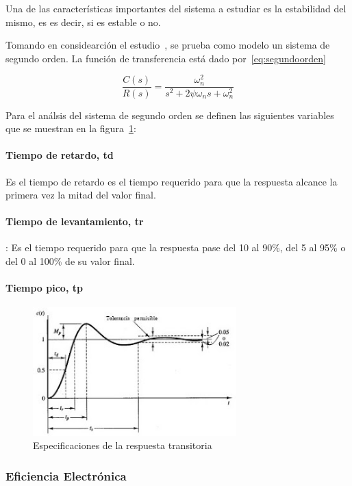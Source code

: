 \documentclass[12pt,twoside,onecolumn]{article}
\begin{document}
Una de las características importantes del sistema a estudiar es la estabilidad del mismo, es es decir, si es estable o no.

Tomando en considearción el estudio~\cite{mazloomi2013analysis}, se prueba como modelo un sistema de segundo orden. La función de transferencia está dado por~\ref{eq:segundoorden}

\begin{equation} \label{eq:segundoroden}
\frac{C(s)}{R(s) }= \frac{\omega_{n}^2}{s^2+2\psi\omega_ns+\omega_n^2}
\end{equation}

Para el análsis del sistema de segundo orden se definen las siguientes variables que se muestran en la figura~\ref{fig:2orden}:
\paragraph{Tiempo  de  retardo,  td} Es el tiempo de retardo es el tiempo requerido para  que la respuesta  alcance la primera vez la mitad del valor final.  
\paragraph{Tiempo de levantamiento, tr} : Es el tiempo requerido  para que la respuesta pase del 10 al 90\%, del 5 al 95\% o del 0 al 100\% de su valor final.
\paragraph{Tiempo pico, tp} 

\begin{figure}
  \centering
   \includegraphics[width=0.7\textwidth]{figures/2orden}
  \caption{Especificaciones de la respuesta transitoria}
  \label{fig:2orden}
\end{figure}

\subsubsection{Eficiencia Electrónica}
\end{document}
